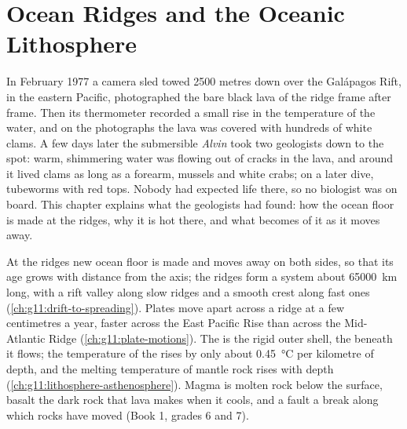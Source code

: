\chapter{Ocean Ridges and the Oceanic Lithosphere}\label{ch:g11:ocean-ridges}

In February 1977 a camera sled towed 2500 metres down over the Galápagos
Rift, in the eastern Pacific, photographed the bare black lava of the ridge
frame after frame. Then its thermometer recorded a small rise in the
temperature of the water, and on the photographs the lava was covered with
hundreds of white clams. A few days later the submersible \emph{Alvin}
took two geologists down to the spot: warm, shimmering water was flowing out
of cracks in the lava, and around it lived clams as long as a forearm,
mussels and white crabs; on a later dive, tubeworms with red tops. Nobody had
expected life there, so no biologist was on board. This chapter explains
what the geologists had found: how the ocean floor is made at the ridges,
why it is hot there, and what becomes of it as it moves away.

\begin{recall}
At the ridges new ocean floor is made and moves away on both sides, so that
its age grows with distance from the axis; the ridges form a system about
\qty{65000}{km} long, with a rift valley along slow ridges and a smooth crest
along fast ones (\cref{ch:g11:drift-to-spreading}). Plates move apart across
a ridge at a few centimetres a year, faster across the East Pacific Rise than
across the Mid-Atlantic Ridge (\cref{ch:g11:plate-motions}). The 
is the rigid outer shell, the  beneath it flows; the temperature
of the  rises by only about \qty{0.45}{\celsius} per kilometre
of depth, and the melting temperature of mantle rock rises with depth
(\cref{ch:g11:lithosphere-asthenosphere}). Magma is molten rock below the
surface, basalt the dark rock that lava makes when it cools, and a fault a
break along which rocks have moved (Book 1, grades 6 and 7).
\end{recall}

